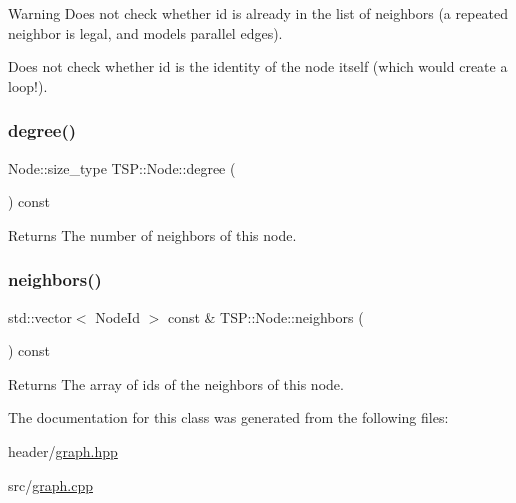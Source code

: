 \begin{DoxyWarning}{Warning}
Does not check whether {\ttfamily id} is already in the list of neighbors (a repeated neighbor is legal, and models parallel edges). 

Does not check whether {\ttfamily id} is the identity of the node itself (which would create a loop!). 
\end{DoxyWarning}
\mbox{\label{classTSP_1_1Node_aaaa462cf10f30be7648f7611112ec879}} 
\subsubsection{\texorpdfstring{degree()}{degree()}}
{\footnotesize\ttfamily Node\+::size\+\_\+type T\+S\+P\+::\+Node\+::degree (\begin{DoxyParamCaption}{ }\end{DoxyParamCaption}) const\hspace{0.3cm}{\ttfamily [inline]}}

\begin{DoxyReturn}{Returns}
The number of neighbors of this node. 
\end{DoxyReturn}
\mbox{\label{classTSP_1_1Node_afcd0a49f62af612b09db62ea0ca14856}} 
\subsubsection{\texorpdfstring{neighbors()}{neighbors()}}
{\footnotesize\ttfamily std\+::vector$<$ Node\+Id $>$ const  \& T\+S\+P\+::\+Node\+::neighbors (\begin{DoxyParamCaption}{ }\end{DoxyParamCaption}) const\hspace{0.3cm}{\ttfamily [inline]}}

\begin{DoxyReturn}{Returns}
The array of ids of the neighbors of this node. 
\end{DoxyReturn}


The documentation for this class was generated from the following files\+:\begin{DoxyCompactItemize}
\item 
header/\hyperlink{graph_8hpp}{graph.\+hpp}\item 
src/\hyperlink{graph_8cpp}{graph.\+cpp}\end{DoxyCompactItemize}

